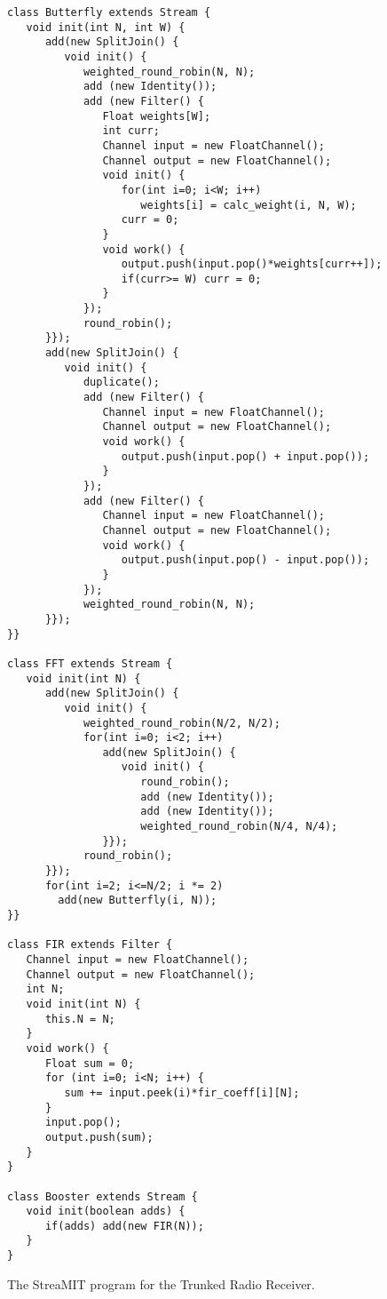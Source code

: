 \begin{figure}[t]
\scriptsize
\begin{verbatim}
class Butterfly extends Stream {
   void init(int N, int W) {
      add(new SplitJoin() {
         void init() {
            weighted_round_robin(N, N);
            add (new Identity());
            add (new Filter() {
               Float weights[W];
               int curr;
               Channel input = new FloatChannel();
               Channel output = new FloatChannel();
               void init() {
                  for(int i=0; i<W; i++)
                     weights[i] = calc_weight(i, N, W);
                  curr = 0;
               }
               void work() {
                  output.push(input.pop()*weights[curr++]);
                  if(curr>= W) curr = 0;
               }    
            });
            round_robin();
      }});
      add(new SplitJoin() {
         void init() {
            duplicate();
            add (new Filter() {   
               Channel input = new FloatChannel();
               Channel output = new FloatChannel();
               void work() {
                  output.push(input.pop() + input.pop());
               }
            });
            add (new Filter() {   
               Channel input = new FloatChannel();
               Channel output = new FloatChannel();
               void work() {
                  output.push(input.pop() - input.pop());
               }
            });
            weighted_round_robin(N, N);
      }});
}}

class FFT extends Stream {
   void init(int N) {
      add(new SplitJoin() {
         void init() {
            weighted_round_robin(N/2, N/2);
            for(int i=0; i<2; i++) 
               add(new SplitJoin() {
                  void init() {
                     round_robin();
                     add (new Identity());
                     add (new Identity());
                     weighted_round_robin(N/4, N/4);
               }});
            round_robin();
      }});
      for(int i=2; i<=N/2; i *= 2)
        add(new Butterfly(i, N));
}}

class FIR extends Filter {
   Channel input = new FloatChannel();
   Channel output = new FloatChannel();           
   int N;
   void init(int N) {
      this.N = N;
   }
   void work() {
      Float sum = 0;
      for (int i=0; i<N; i++) {
         sum += input.peek(i)*fir_coeff[i][N];
      }
      input.pop();
      output.push(sum);
   }
}

class Booster extends Stream {
   void init(boolean adds) {
      if(adds) add(new FIR(N));
   }
}
\end{verbatim}
\vspace{-12pt}
\caption{\protect\small The StreaMIT program for the Trunked Radio Receiver.
\protect\label{fig:radiocode}}
\vspace{-12pt}
\end{figure}

